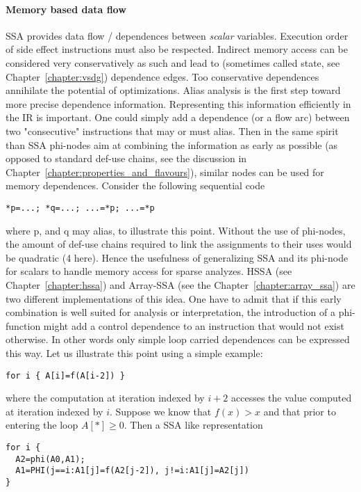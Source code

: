 \paragraph{Memory based data flow}
SSA provides data flow / dependences between \emph{scalar} variables. Execution order of side effect instructions must also be respected. Indirect memory access can be considered very conservatively as such and lead to (sometimes called state, see Chapter~\ref{chapter:vsdg}) dependence edges. Too conservative dependences annihilate the potential of optimizations. Alias analysis is the first step toward more precise dependence information. Representing this information efficiently in the IR is important. One could simply add a dependence (or a flow arc) between two "consecutive" instructions that may or must alias. Then in the same spirit than SSA phi-nodes aim at combining the information as early as possible (as opposed to standard def-use chains, see the discussion in Chapter~\ref{chapter:properties_and_flavours}), similar nodes can be used for memory dependences. Consider the following sequential code 
\begin{verbatim}
*p=...; *q=...; ...=*p; ...=*p
\end{verbatim}
 where p, and q may alias, to illustrate this point. Without the use of phi-nodes, the amount of def-use chains required to link the assignments to their uses would be quadratic (4 here). Hence the usefulness of generalizing SSA and its phi-node for scalars to handle memory access for sparse analyzes. HSSA (see Chapter~\ref{chapter:hssa}) and Array-SSA (see the Chapter~\ref{chapter:array_ssa}) are two different implementations of this idea. One have to admit that if this early combination is well suited for analysis or interpretation, the introduction of a phi-function might add a control dependence to an instruction that would not exist otherwise. In other words only simple loop carried dependences can be expressed this way. Let us illustrate this point using a simple example: 
\begin{verbatim}
for i { A[i]=f(A[i-2]) }
\end{verbatim}
where the computation at iteration indexed by $i+2$ accesses the value computed at iteration indexed by $i$. Suppose we know that $f(x)>x$ and that prior to entering the loop $A[*]\geq 0$. Then a SSA like representation 
\begin{verbatim}
for i { 
  A2=phi(A0,A1); 
  A1=PHI(j==i:A1[j]=f(A2[j-2]), j!=i:A1[j]=A2[j]) 
}
\end{verbatim}

